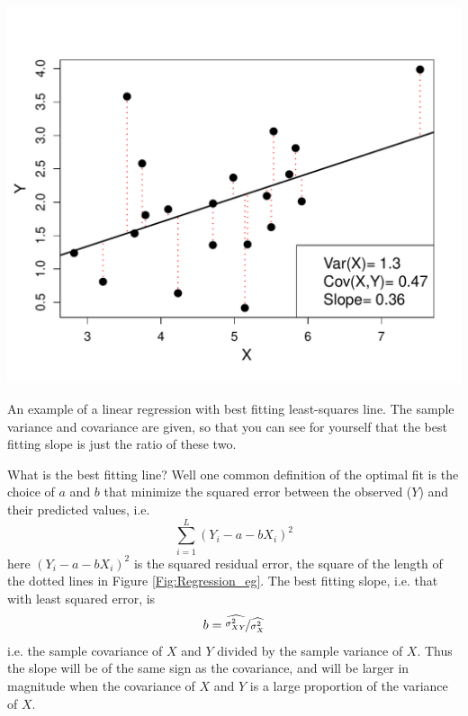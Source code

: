  \begin{marginfigure}
 \begin{center}
   \includegraphics[width=\textwidth]{math_background/dist_pics/Linear_regression.pdf}\end{center}
 \caption{An example of a linear regression with best fitting
   least-squares line. The sample variance and covariance are given,
   so that you can see for yourself that the best fitting slope is
   just the ratio of these two. 
   }\label{Fig:Regression_eg}
 \end{marginfigure}

What
is the best fitting line? Well one common definition of the optimal fit is
the choice of $a$ and $b$ that minimize the squared error
between the observed ($Y$) and their predicted values, i.e.
\begin{equation}
\sum_{i=1}^L  (Y_i  - a -  b X_i )^2
\end{equation}
here $(Y_i  - a -  b X_i)^2$ is the squared residual error, the square
of the length of the dotted lines in Figure
\ref{Fig:Regression_eg}. The best fitting slope, i.e. that with least
squared error, is
\begin{equation}
b = \nicefrac{ \widehat{\sigma_{XY}^2}}{ \widehat{\sigma_{X}^2}} \label{eqn:slope_linear_reg}
\end{equation}
i.e. the sample covariance of $X$ and $Y$ divided by the sample
variance of $X$. Thus the slope will be of the same sign as the
covariance, and will be larger in magnitude when the covariance of $X$
and $Y$ is a large proportion of the variance of $X$.


